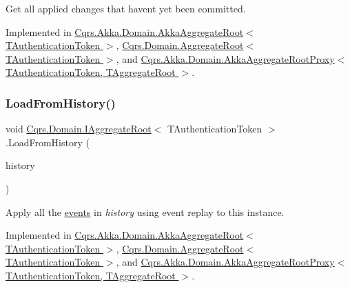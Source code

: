Get all applied changes that haven\textquotesingle{}t yet been committed. 



Implemented in \hyperlink{classCqrs_1_1Akka_1_1Domain_1_1AkkaAggregateRoot_a2d11510fec0129ba318f63f7103aeec0_a2d11510fec0129ba318f63f7103aeec0}{Cqrs.\+Akka.\+Domain.\+Akka\+Aggregate\+Root$<$ T\+Authentication\+Token $>$}, \hyperlink{classCqrs_1_1Domain_1_1AggregateRoot_a625e885ec7885a686f729ed1efe3a8fa_a625e885ec7885a686f729ed1efe3a8fa}{Cqrs.\+Domain.\+Aggregate\+Root$<$ T\+Authentication\+Token $>$}, and \hyperlink{classCqrs_1_1Akka_1_1Domain_1_1AkkaAggregateRootProxy_afa620ced4762b0539da23ca063fed489_afa620ced4762b0539da23ca063fed489}{Cqrs.\+Akka.\+Domain.\+Akka\+Aggregate\+Root\+Proxy$<$ T\+Authentication\+Token, T\+Aggregate\+Root $>$}.

\mbox{\label{interfaceCqrs_1_1Domain_1_1IAggregateRoot_afe9329ee26ae68613059189ca64dfe60_afe9329ee26ae68613059189ca64dfe60}} 
\subsubsection{\texorpdfstring{Load\+From\+History()}{LoadFromHistory()}}
{\footnotesize\ttfamily void \hyperlink{interfaceCqrs_1_1Domain_1_1IAggregateRoot}{Cqrs.\+Domain.\+I\+Aggregate\+Root}$<$ T\+Authentication\+Token $>$.Load\+From\+History (\begin{DoxyParamCaption}\item[{I\+Enumerable$<$ \hyperlink{interfaceCqrs_1_1Events_1_1IEvent}{I\+Event}$<$ T\+Authentication\+Token $>$$>$}]{history }\end{DoxyParamCaption})}



Apply all the \hyperlink{}{events} in {\itshape history}  using event replay to this instance. 



Implemented in \hyperlink{classCqrs_1_1Akka_1_1Domain_1_1AkkaAggregateRoot_af6d84b07d4e9475bb88e769ac9081830_af6d84b07d4e9475bb88e769ac9081830}{Cqrs.\+Akka.\+Domain.\+Akka\+Aggregate\+Root$<$ T\+Authentication\+Token $>$}, \hyperlink{classCqrs_1_1Domain_1_1AggregateRoot_aec873ad6e4c98309cad2d9f1c534aebb_aec873ad6e4c98309cad2d9f1c534aebb}{Cqrs.\+Domain.\+Aggregate\+Root$<$ T\+Authentication\+Token $>$}, and \hyperlink{classCqrs_1_1Akka_1_1Domain_1_1AkkaAggregateRootProxy_ae611077a51a215aef7fd0e106734b386_ae611077a51a215aef7fd0e106734b386}{Cqrs.\+Akka.\+Domain.\+Akka\+Aggregate\+Root\+Proxy$<$ T\+Authentication\+Token, T\+Aggregate\+Root $>$}.

